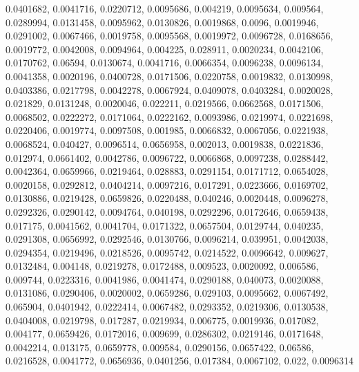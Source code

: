 0.0401682, 0.0041716, 0.0220712, 0.0095686, 0.004219, 0.0095634, 0.009564, 0.0289994, 0.0131458, 0.0095962, 0.0130826, 0.0019868, 0.0096, 0.0019946, 0.0291002, 0.0067466, 0.0019758, 0.0095568, 0.0019972, 0.0096728, 0.0168656, 0.0019772, 0.0042008, 0.0094964, 0.004225, 0.028911, 0.0020234, 0.0042106, 0.0170762, 0.06594, 0.0130674, 0.0041716, 0.0066354, 0.0096238, 0.0096134, 0.0041358, 0.0020196, 0.0400728, 0.0171506, 0.0220758, 0.0019832, 0.0130998, 0.0403386, 0.0217798, 0.0042278, 0.0067924, 0.0409078, 0.0403284, 0.0020028, 0.021829, 0.0131248, 0.0020046, 0.022211, 0.0219566, 0.0662568, 0.0171506, 0.0068502, 0.0222272, 0.0171064, 0.0222162, 0.0093986, 0.0219974, 0.0221698, 0.0220406, 0.0019774, 0.0097508, 0.001985, 0.0066832, 0.0067056, 0.0221938, 0.0068524, 0.040427, 0.0096514, 0.0656958, 0.002013, 0.0019838, 0.0221836, 0.012974, 0.0661402, 0.0042786, 0.0096722, 0.0066868, 0.0097238, 0.0288442, 0.0042364, 0.0659966, 0.0219464, 0.028883, 0.0291154, 0.0171712, 0.0654028, 0.0020158, 0.0292812, 0.0404214, 0.0097216, 0.017291, 0.0223666, 0.0169702, 0.0130886, 0.0219428, 0.0659826, 0.0220488, 0.040246, 0.0020448, 0.0096278, 0.0292326, 0.0290142, 0.0094764, 0.040198, 0.0292296, 0.0172646, 0.0659438, 0.017175, 0.0041562, 0.0041704, 0.0171322, 0.0657504, 0.0129744, 0.040235, 0.0291308, 0.0656992, 0.0292546, 0.0130766, 0.0096214, 0.039951, 0.0042038, 0.0294354, 0.0219496, 0.0218526, 0.0095742, 0.0214522, 0.0096642, 0.009627, 0.0132484, 0.004148, 0.0219278, 0.0172488, 0.009523, 0.0020092, 0.006586, 0.009744, 0.0223316, 0.0041986, 0.0041474, 0.0290188, 0.040073, 0.0020088, 0.0131086, 0.0290406, 0.0020002, 0.0659286, 0.029103, 0.0095662, 0.0067492, 0.065904, 0.0401942, 0.0222414, 0.0067482, 0.0293352, 0.0219306, 0.0130538, 0.0404008, 0.0219798, 0.017287, 0.0219934, 0.006775, 0.0019936, 0.017082, 0.004177, 0.0659426, 0.0172016, 0.009699, 0.0286302, 0.0219146, 0.0171648, 0.0042214, 0.013175, 0.0659778, 0.009584, 0.0290156, 0.0657422, 0.06586, 0.0216528, 0.0041772, 0.0656936, 0.0401256, 0.017384, 0.0067102, 0.022, 0.0096314